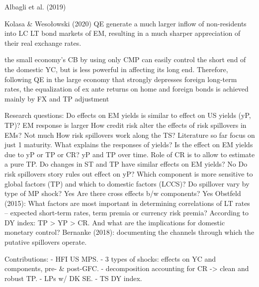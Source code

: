Albagli et al. (2019)


Kolasa \& Wesołowski (2020)
QE generate a much larger inflow of non-residents into LC LT bond markets of EM, resulting in a much sharper appreciation of their real exchange rates.

the small economy's CB by using only CMP can easily control the short end of the domestic YC, but is less powerful in affecting its long end. Therefore, following QE in the large economy that strongly depresses foreign long-term rates, the equalization of ex ante returns on home and foreign bonds is achieved mainly by FX and TP adjustment

Research questions:
Do effects on EM yields is similar to effect on US yields (yP, TP)? EM response is larger
How credit risk alter the effects of risk spillovers in EMs? Not much
How risk spillovers work along the TS? Literature so far focus on just 1 maturity.
What explains the responses of yields? Is the effect on EM yields due to yP or TP or CR? yP and TP over time. Role of CR is to allow to estimate a pure TP.
Do changes in ST and TP have similar effects on EM yields? No
Do risk spillovers story rules out effect on yP?
Which component is more sensitive to global factors (TP) and which to domestic factors (LCCS)?
Do spillover vary by type of MP shock? Yes
Are there cross effects b/w components? Yes
Obstfeld (2015): What factors are most important in determining correlations of LT rates – expected short-term rates, term premia or currency risk premia? According to DY index: TP > YP > CR.
And what are the implications for domestic monetary control?
Bernanke (2018):  documenting the channels through which the putative spillovers operate.

Contributions:
- HFI US MPS.
- 3 types of shocks: effects on YC and components, pre- \& post-GFC.
- decomposition accounting for CR -> clean and robust TP.
- LPs w/ DK SE.
- TS DY index.